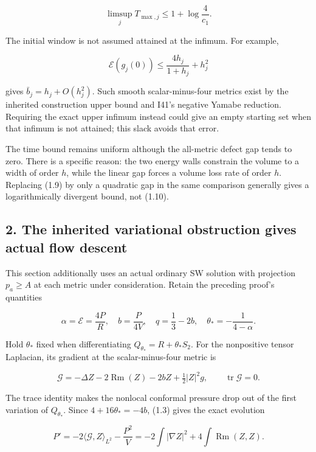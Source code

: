 \documentclass[
  10pt,
]{article}
\begin{document}
\[
              \boxed{\limsup_j T_{\max,j}
                          \le1+\log\frac4{c_1}.}               \tag{1.10}
\]

The initial window is not assumed attained at the infimum. For example,

\[
 \mathcal E(g_j(0))\le\frac{4h_j}{1+h_j}+h_j^2
\]

gives \(\bar b_j=h_j+O(h_j^2)\). Such smooth scalar-minus-four metrics
exist by the inherited construction upper bound and I41's negative
Yamabe reduction. Requiring the exact upper infimum instead could give
an empty starting set when that infimum is not attained; this slack
avoids that error.

The time bound remains uniform although the all-metric defect gap tends
to zero. There is a specific reason: the two energy walls constrain the
volume to a width of order \(h\), while the linear gap forces a volume
loss rate of order \(h\). Replacing (1.9) by only a quadratic gap in the
same comparison generally gives a logarithmically divergent bound, not
(1.10).

\hypertarget{the-inherited-variational-obstruction-gives-actual-flow-descent}{%
\subsection{2. The inherited variational obstruction gives actual flow
descent}\label{the-inherited-variational-obstruction-gives-actual-flow-descent}}

This section additionally uses an actual ordinary SW solution with
projection \(p_a\ge A\) at each metric under consideration. Retain the
preceding proof's quantities

\[
 \alpha=\mathcal E=\frac{4P}{R},\quad b=\frac P{4V},\quad
 q=\frac13-2b,\quad \theta_*=-\frac1{4-\alpha}.
\]

Hold \(\theta_*\) fixed when differentiating
\(Q_{\theta_*}=R+\theta_*S_2\). For the nonpositive tensor Laplacian,
its gradient at the scalar-minus-four metric is

\[
 \mathcal G=-\Delta Z-2\operatorname{Rm}(Z)-2bZ
                                      +\tfrac12|Z|^2g,
 \qquad \operatorname{tr}\mathcal G=0.               \tag{2.1}
\]

The trace identity makes the nonlocal conformal pressure drop out of the
first variation of \(Q_{\theta_*}\). Since \(4+16\theta_*=-4b\), (1.3)
gives the exact evolution

\[
 \boxed{P'=-2\langle\mathcal G,Z\rangle_{L^2}-\frac{P^2}V
          =-2\int|\nabla Z|^2+4\int\operatorname{Rm}(Z,Z).}     \tag{2.2}
\]
\end{document}
